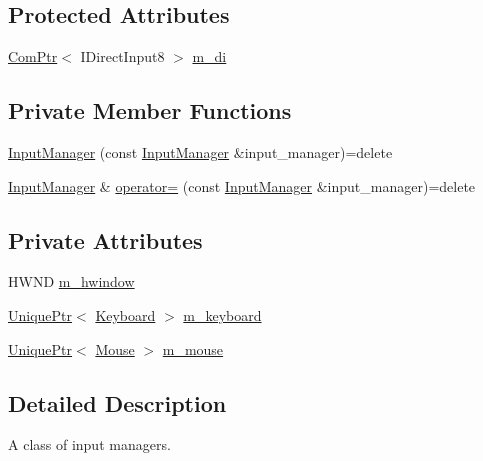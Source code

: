 \subsection*{Protected Attributes}
\begin{DoxyCompactItemize}
\item 
\hyperlink{namespacemage_ae74f374780900893caa5555d1031fd79}{Com\+Ptr}$<$ I\+Direct\+Input8 $>$ \hyperlink{classmage_1_1_input_manager_a0ffbd0e68b5bab33c35f310625884f3a}{m\+\_\+di}
\end{DoxyCompactItemize}
\subsection*{Private Member Functions}
\begin{DoxyCompactItemize}
\item 
\hyperlink{classmage_1_1_input_manager_a68503617f418bf270dc39bb18019b46d}{Input\+Manager} (const \hyperlink{classmage_1_1_input_manager}{Input\+Manager} \&input\+\_\+manager)=delete
\item 
\hyperlink{classmage_1_1_input_manager}{Input\+Manager} \& \hyperlink{classmage_1_1_input_manager_ad9caa8b7e99a69b774887f342bd5dda0}{operator=} (const \hyperlink{classmage_1_1_input_manager}{Input\+Manager} \&input\+\_\+manager)=delete
\end{DoxyCompactItemize}
\subsection*{Private Attributes}
\begin{DoxyCompactItemize}
\item 
H\+W\+ND \hyperlink{classmage_1_1_input_manager_a07a1d3a593bc497c747c6d2e4605a229}{m\+\_\+hwindow}
\item 
\hyperlink{namespacemage_a8c307fbcc33bce9b7f2aa4c26c3b95cf}{Unique\+Ptr}$<$ \hyperlink{classmage_1_1_keyboard}{Keyboard} $>$ \hyperlink{classmage_1_1_input_manager_a196bdd04e169e89d0fa5f6a4a180e4cb}{m\+\_\+keyboard}
\item 
\hyperlink{namespacemage_a8c307fbcc33bce9b7f2aa4c26c3b95cf}{Unique\+Ptr}$<$ \hyperlink{classmage_1_1_mouse}{Mouse} $>$ \hyperlink{classmage_1_1_input_manager_aab9773cccf9626a7e2acb99227b42e37}{m\+\_\+mouse}
\end{DoxyCompactItemize}


\subsection{Detailed Description}
A class of input managers. 

